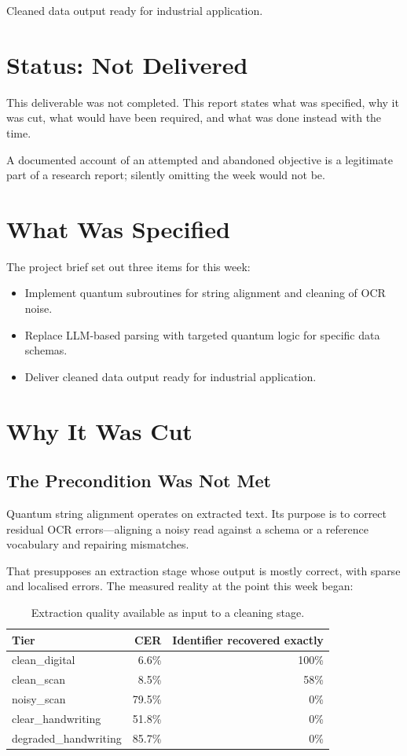 \documentclass[11pt,a4paper]{article}
\begin{document}
{Cleaned data output ready for industrial application.}

\section{Status: Not Delivered}

This deliverable was not completed. This report states what was specified, why it
was cut, what would have been required, and what was done instead with the time.

A documented account of an attempted and abandoned objective is a legitimate part
of a research report; silently omitting the week would not be.

\section{What Was Specified}

The project brief set out three items for this week:

\begin{itemize}
\item Implement quantum subroutines for string alignment and cleaning of OCR
      noise.
\item Replace LLM-based parsing with targeted quantum logic for specific data
      schemas.
\item Deliver cleaned data output ready for industrial application.
\end{itemize}

\section{Why It Was Cut}

\subsection{The Precondition Was Not Met}

Quantum string alignment operates on extracted text. Its purpose is to correct
residual OCR errors---aligning a noisy read against a schema or a reference
vocabulary and repairing mismatches.

That presupposes an extraction stage whose output is mostly correct, with sparse
and localised errors. The measured reality at the point this week began:

\begin{table}[h]
\centering
\caption{Extraction quality available as input to a cleaning stage.}
\begin{tabular}{@{}lrr@{}}
\toprule
Tier & CER & Identifier recovered exactly \\
\midrule
clean\_digital & 6.6\% & 100\% \\
clean\_scan & 8.5\% & 58\% \\
noisy\_scan & 79.5\% & 0\% \\
clear\_handwriting & 51.8\% & 0\% \\
degraded\_handwriting & 85.7\% & 0\% \\
\bottomrule
\end{tabular}
\end{table}
\end{document}
